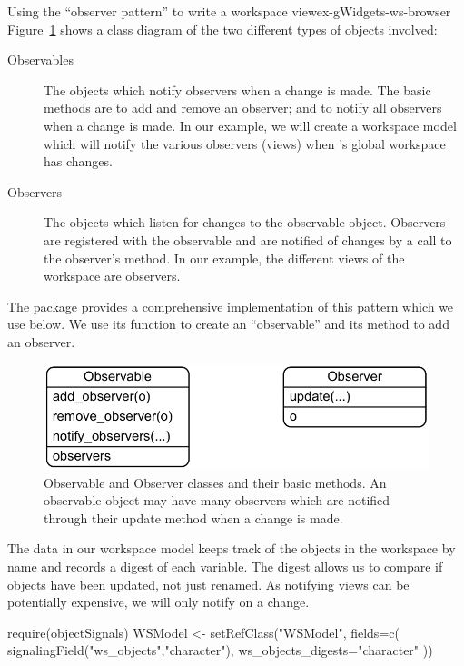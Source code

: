 \begin{example}{Using the ``observer pattern'' to write a workspace view}{ex-gWidgets-ws-browser}
Figure~\ref{fig:observer-observable} shows a class diagram of the two
different types of objects involved:


\begin{description}
\item[Observables] The objects which notify observers when a change is
  made. The basic methods are to add and remove an observer; and to
  notify all observers when a change is made. In our example, we will
  create a workspace model which will notify the various observers
  (views) when \R's global workspace has changes.
\item[Observers] The objects which listen for changes to the
  observable object. Observers are registered with the observable and
  are notified of changes by a call to the observer's 
  method. In our example, the different views of the workspace are
  observers.
\end{description}
\vspace{12pt}

The package  provides a comprehensive
implementation of this pattern which we use below. We use its
 function to create an ``observable'' and its
 method to add an observer.
\\

\begin{figure}
  \centering
  \includegraphics[width=.6\textwidth]{fig-gWidgets-observable-observer-uml.png}
 \caption{Observable and Observer classes and their basic methods. An observable object may have many observers which are notified through their update method when a change is made.}
  \label{fig:observer-observable}
\end{figure}



The data in our workspace model keeps track of the objects in the
workspace by name and records a digest of each variable. The digest
allows us to compare if objects have been updated, not just
renamed. As notifying views can be potentially expensive, we will only
notify on a change. 

\begin{Schunk}
\begin{Sinput}
 require(objectSignals)
 WSModel <- setRefClass("WSModel",
               fields=c(
                 signalingField("ws_objects","character"),
                 ws_objects_digests="character"
                 ))
\end{Sinput}
\end{Schunk}
%




\end{example}

